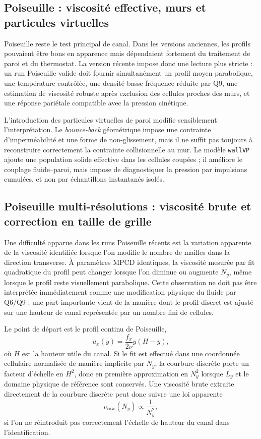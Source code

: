 \documentclass[11pt,a4paper]{article}
\begin{document}
\subsection{Poiseuille : viscosité effective, murs et particules virtuelles}

Poiseuille reste le test principal de canal. Dans les versions anciennes, les profils pouvaient être bons en apparence mais dépendaient fortement du traitement de paroi et du thermostat. La version récente impose donc une lecture plus stricte : un run Poiseuille valide doit fournir simultanément un profil moyen parabolique, une température contrôlée, une densité basse fréquence réduite par Q9, une estimation de viscosité robuste après exclusion des cellules proches des murs, et une réponse pariétale compatible avec la pression cinétique.

L'introduction des particules virtuelles de paroi modifie sensiblement l'interprétation. Le \emph{bounce-back} géométrique impose une contrainte d'imperméabilité et une forme de non-glissement, mais il ne suffit pas toujours à reconstruire correctement la contrainte collisionnelle au mur. Le modèle \texttt{wallVP} ajoute une population solide effective dans les cellules coupées ; il améliore le couplage fluide--paroi, mais impose de diagnostiquer la pression par impulsions cumulées, et non par échantillons instantanés isolés.

\subsection{Poiseuille multi-résolutions : viscosité brute et correction en taille de grille}

Une difficulté apparue dans les runs Poiseuille récents est la variation apparente de la viscosité identifiée lorsque l'on modifie le nombre de mailles dans la direction transverse. À paramètres MPCD identiques, la viscosité mesurée par fit quadratique du profil peut changer lorsque l'on diminue ou augmente \(N_y\), même lorsque le profil reste visuellement parabolique. Cette observation ne doit pas être interprétée immédiatement comme une modification physique du fluide par Q6/Q9 : une part importante vient de la manière dont le profil discret est ajusté sur une hauteur de canal représentée par un nombre fini de cellules.

Le point de départ est le profil continu de Poiseuille,
\begin{equation}
  u_x(y)=\frac{f_x}{2\nu} y(H-y),
\end{equation}
où \(H\) est la hauteur utile du canal. Si le fit est effectué dans une coordonnée cellulaire normalisée de manière implicite par \(N_y\), la courbure discrète porte un facteur d'échelle en \(H^2\), donc en première approximation en \(N_y^2\) lorsque \(L_y\) et le domaine physique de référence sont conservés. Une viscosité brute extraite directement de la courbure discrète peut donc suivre une loi apparente
\begin{equation}
  \nu_{\mathrm{raw}}(N_y) \propto \frac{1}{N_y^2},
\end{equation}
si l'on ne réintroduit pas correctement l'échelle de hauteur du canal dans l'identification.
\end{document}
